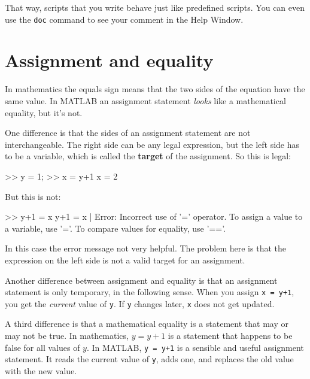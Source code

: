 \documentclass[main.tex]{subfiles}
\begin{document}
That way, scripts that you write behave just like predefined scripts.
You can even use the {\tt doc} command to see your comment in the
{\sf Help Window}.


\section{Assignment and equality}


In mathematics the equals sign means that the two sides of the
equation have the same value.  In MATLAB an assignment statement
{\em looks} like a mathematical equality, but it's not.

One difference is that the sides of an assignment statement are not
interchangeable.  The right side can be any legal expression, but
the left side has to be a variable, which is called the 
{\bf target} of the assignment.  So this is legal:

\begin{code}
>> y = 1;
>> x = y+1
x = 2
\end{code}

But this is not:

\begin{code}
>> y+1 = x
 y+1 = x
     |
Error: Incorrect use of '=' operator. 
To assign a value to a variable, use '='. 
To compare values for equality, use '=='.
\end{code}

In this case the error message not very helpful.  The problem here is that the expression on the left side is not a valid target for an assignment.


Another difference between assignment and equality is that an assignment statement is only temporary, in the following sense.
When you assign {\tt x = y+1}, you get the
{\em current} value of {\tt y}.  If {\tt y} changes later, {\tt x}
does not get updated.

A third difference is that a mathematical equality is a statement that
may or may not be true.  In mathematics, $y = y+1$ is a statement that
happens to be false for all values of $y$.  
In MATLAB, {\tt y = y+1} is a sensible and useful assignment statement.
It reads the current value of {\tt y}, adds one, and replaces the old value with the new value.
\end{document}
